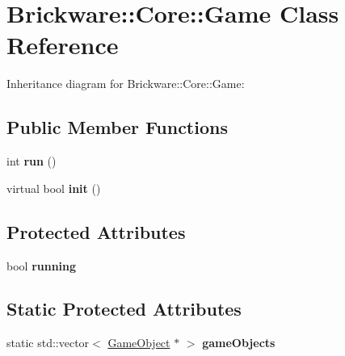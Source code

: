 \hypertarget{classBrickware_1_1Core_1_1Game}{}\section{Brickware\+:\+:Core\+:\+:Game Class Reference}
\label{classBrickware_1_1Core_1_1Game}


Inheritance diagram for Brickware\+:\+:Core\+:\+:Game\+:
\subsection*{Public Member Functions}
\begin{DoxyCompactItemize}
\item 
\hypertarget{classBrickware_1_1Core_1_1Game_a99fb161fbbe87d25a8b73265a0611e58}{}int {\bfseries run} ()\label{classBrickware_1_1Core_1_1Game_a99fb161fbbe87d25a8b73265a0611e58}

\item 
\hypertarget{classBrickware_1_1Core_1_1Game_a8ff3a6838bad4ea9493c103f96d7bff3}{}virtual bool {\bfseries init} ()\label{classBrickware_1_1Core_1_1Game_a8ff3a6838bad4ea9493c103f96d7bff3}

\end{DoxyCompactItemize}
\subsection*{Protected Attributes}
\begin{DoxyCompactItemize}
\item 
\hypertarget{classBrickware_1_1Core_1_1Game_a914d690c42b80604b07999ab5dce89c0}{}bool {\bfseries running}\label{classBrickware_1_1Core_1_1Game_a914d690c42b80604b07999ab5dce89c0}

\end{DoxyCompactItemize}
\subsection*{Static Protected Attributes}
\begin{DoxyCompactItemize}
\item 
\hypertarget{classBrickware_1_1Core_1_1Game_adec44e3bd5ce99e509270ccc198ce378}{}static std\+::vector$<$ \hyperlink{classBrickware_1_1Core_1_1GameObject}{Game\+Object} $\ast$ $>$ {\bfseries game\+Objects}\label{classBrickware_1_1Core_1_1Game_adec44e3bd5ce99e509270ccc198ce378}

\end{DoxyCompactItemize}
